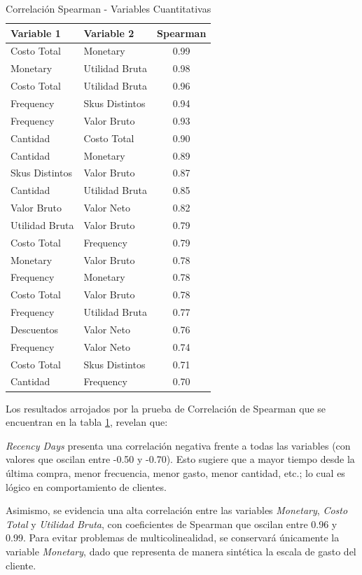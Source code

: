 \begin{table}[H]
\centering
\caption{Correlación Spearman - Variables Cuantitativas}
\label{tab:corr_cuantitativas}
\renewcommand{\arraystretch}{1.2}
\begin{tabular}{l l c} %
\hline
\textbf{Variable 1} & \textbf{Variable 2} & \textbf{Spearman} \\
\hline
Costo Total & Monetary & 0.99 \\ 
Monetary & Utilidad Bruta & 0.98 \\ 
Costo Total & Utilidad Bruta & 0.96 \\
Frequency & Skus Distintos & 0.94 \\ 
Frequency & Valor Bruto & 0.93 \\ 
Cantidad & Costo Total & 0.90 \\
Cantidad & Monetary & 0.89 \\
Skus Distintos & Valor Bruto & 0.87 \\
Cantidad & Utilidad Bruta & 0.85 \\ 
Valor Bruto & Valor Neto & 0.82 \\ 
Utilidad Bruta & Valor Bruto & 0.79 \\
Costo Total  & Frequency & 0.79 \\  
Monetary  & Valor Bruto & 0.78 \\ 
Frequency & Monetary & 0.78 \\ 
Costo Total & Valor Bruto & 0.78 \\
Frequency & Utilidad Bruta & 0.77 \\ 
Descuentos & Valor Neto & 0.76 \\ 
Frequency & Valor Neto & 0.74 \\ 
Costo Total & Skus Distintos & 0.71 \\ 
Cantidad & Frequency & 0.70 \\ 
\hline
\end{tabular}
\end{table}

Los resultados arrojados por la prueba de Correlación de Spearman que se encuentran en la tabla \ref{tab:corr_cuantitativas}, revelan que:

\textit{Recency Days} presenta una correlación negativa frente a todas las variables (con valores que oscilan entre -0.50 y -0.70). Esto sugiere que a mayor tiempo desde la última compra, menor frecuencia, menor gasto, menor cantidad, etc.; lo cual es lógico en comportamiento de clientes.

Asimismo, se evidencia una alta correlación entre las variables \textit{Monetary}, \textit{Costo Total} y \textit{Utilidad Bruta}, con coeficientes de Spearman que oscilan entre 0.96 y 0.99. Para evitar problemas de multicolinealidad, se conservará únicamente la variable \textit{Monetary}, dado que representa de manera sintética la escala de gasto del cliente.


